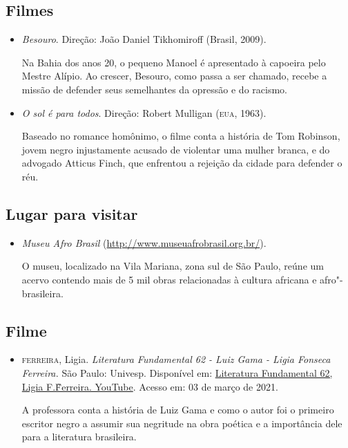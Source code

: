 \documentclass[12pt]{extarticle}
\begin{document}
\subsection{Filmes}
\begin{itemize}
\item\textit{Besouro}. Direção: João Daniel Tikhomiroff (Brasil, 2009).

Na Bahia dos anos 20, o pequeno Manoel é apresentado à capoeira pelo
Mestre Alípio. Ao crescer, Besouro, como passa a ser chamado, recebe a
missão de defender seus semelhantes da opressão e do racismo.

\item\textit{O sol é para todos}. Direção: Robert Mulligan (\textsc{eua}, 1963).

Baseado no romance homônimo, o filme conta a história de Tom Robinson,
jovem negro injustamente acusado de violentar uma mulher branca, e do
advogado Atticus Finch, que enfrentou a rejeição da cidade para defender
o réu.
\end{itemize}

\subsection{Lugar para visitar}

\begin{itemize}
\item\textit{Museu Afro Brasil}
(\url{http://www.museuafrobrasil.org.br/}).

O museu, localizado na Vila Mariana, zona sul de São Paulo, reúne um
acervo contendo mais de 5 mil obras relacionadas à cultura africana e
afro"-brasileira.
\end{itemize}

\subsection{Filme}
\begin{itemize}
\item\textsc{ferreira}, Ligia. \textit{Literatura Fundamental 62 - Luiz Gama - Ligia
Fonseca Ferreira.} São Paulo: Univesp. Disponível em:
\href{https://www.youtube.com/watch?v=WqSuNcU2jdA}{Literatura
Fundamental 62, Ligia F.\~Ferreira. YouTube}. Acesso
em: 03 de março de 2021.

A professora conta a história de Luiz Gama e como o autor foi o primeiro
escritor negro a assumir sua negritude na obra poética e a importância
dele para a literatura brasileira.
\end{itemize}
\end{document}
